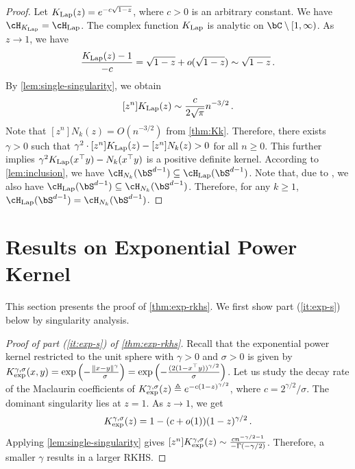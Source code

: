 \documentclass[11pt]{article}
\newcommand{\hlap}{\cH_{\textnormal{Lap}}}
\newcommand{\klap}{K_{\textnormal{Lap}}}
\newcommand{\kexp}{K_{\textnormal{exp}}}
\begin{document}
\begin{proof}
Let $\klap(z) = e^{-c\sqrt{1-z}}$, where $c>0$ is an arbitrary constant. We have $\cH_{\klap} = \hlap$.  The complex function $\klap$ is analytic on $\bC\setminus [1,\infty)$. As $z\to 1$, we have \[
\frac{\klap(z)-1}{-c} = \sqrt{1-z} + o(\sqrt{1-z}) \sim \sqrt{1-z} \,.
\]
By \cref{lem:single-singularity},
we obtain \begin{equation}\label{eq:asymp-klap}
[z^n]\klap(z) \sim \frac{c}{2\sqrt{\pi}} n^{-3/2}\,.
\end{equation}
Note that $[z^n]N_k(z) = O(n^{-3/2})$ from \cref{thm:Kk}. Therefore, there exists $\gamma>0$ such that $\gamma^2\cdot [z^n]\klap(z) - [z^n]N_k(z) > 0 $ for all $n\ge 0$. This further implies $\gamma^2 \klap(x^\top y) - N_k(x^\top y) $ 
is a positive definite kernel. According to 
 \cref{lem:inclusion}, we have $\cH_{N_k}(\bS^{d-1}) \subseteq \hlap(\bS^{d-1})$.
 Note that, due to \cite[Theorem 3]{geifman2020similarity}, we also have $\hlap(\bS^{d-1}) \subseteq \cH_{N_k}(\bS^{d-1})$.
 Therefore, for any $k\geq 1$, $\hlap(\bS^{d-1}) = \cH_{N_k}(\bS^{d-1})$.
 
 
\end{proof}



\section{Results on Exponential Power Kernel}
This section presents the proof of \cref{thm:exp-rkhs}. 
We first show part (\ref{it:exp-s}) below by singularity analysis. 

\begin{proof}[Proof of part (\ref{it:exp-s}) of \cref{thm:exp-rkhs}]
Recall that
the exponential power kernel restricted to the unit sphere with $\gamma>0$ and $\sigma>0$ is given by $
\kexp^{\gamma,\sigma}(x,y) = \exp\left(-\frac{\|x-y\|^\gamma}{\sigma}\right) = \exp\left(-\frac{(2(1-x^\top y))^{\gamma/2}}{\sigma}\right)
$.
Let us study the decay rate of the Maclaurin coefficients of $\kexp^{\gamma,\sigma}(z) \triangleq e^{-c(1-z)^{\gamma/2}}$, where $c = 2^{\gamma /2} / \sigma$. The dominant singularity lies at $z=1$. As $z\to 1$, we get \[
\kexp^{\gamma,\sigma}(z) = 1 - (c+o(1))(1-z)^{\gamma/2} \,.
\]
Applying \cref{lem:single-singularity} gives $
[z^n]\kexp^{\gamma,\sigma}(z) \sim \frac{cn^{-\gamma/2-1}}{-\Gamma(-\gamma/2)}
$.
Therefore, a smaller $\gamma$ results in a larger RKHS.
\end{proof}
\end{document}
